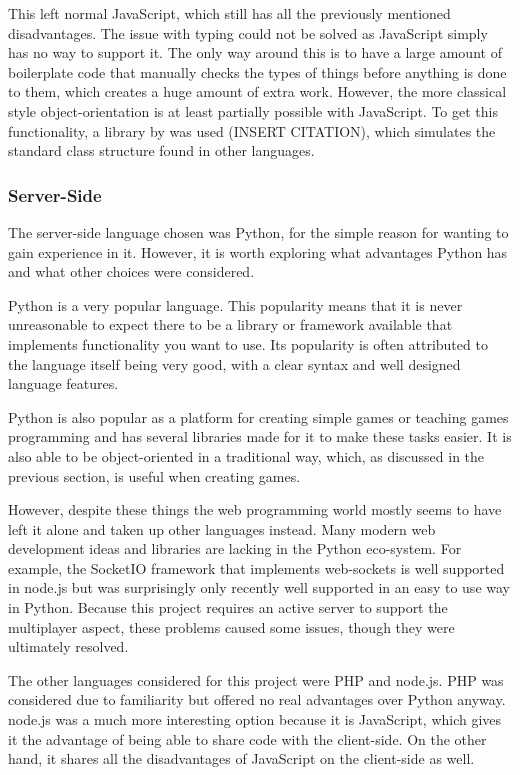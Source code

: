 This left normal JavaScript, which still has all the previously mentioned disadvantages. The issue with typing could not be solved as JavaScript simply has no way to support it. The only way around this is to have a large amount of boilerplate code that manually checks the types of things before anything is done to them, which creates a huge amount of extra work. However, the more classical style object-orientation is at least partially possible with JavaScript. To get this functionality, a library by was used (INSERT CITATION), which simulates the standard class structure found in other languages.

\subsubsection{Server-Side}
The server-side language chosen was Python, for the simple reason for wanting to gain experience in it. However, it is worth exploring what advantages Python has and what other choices were considered.

Python is a very popular language. This popularity means that it is never unreasonable to expect there to be a library or framework available that implements functionality you want to use. Its popularity is often attributed to the language itself being very good, with a clear syntax and well designed language features.

Python is also popular as a platform for creating simple games or teaching games programming and has several libraries made for it to make these tasks easier. It is also able to be object-oriented in a traditional way, which, as discussed in the previous section, is useful when creating games.

However, despite these things the web programming world mostly seems to have left it alone and taken up other languages instead. Many modern web development ideas and libraries are lacking in the Python eco-system. For example, the SocketIO framework that implements web-sockets is well supported in node.js but was surprisingly only recently well supported in an easy to use way in Python. Because this project requires an active server to support the multiplayer aspect, these problems caused some issues, though they were ultimately resolved.

The other languages considered for this project were PHP and node.js. PHP was considered due to familiarity but offered no real advantages over Python anyway. node.js was a much more interesting option because it is JavaScript, which gives it the advantage of being able to share code with the client-side. On the other hand, it shares all the disadvantages of JavaScript on the client-side as well.

